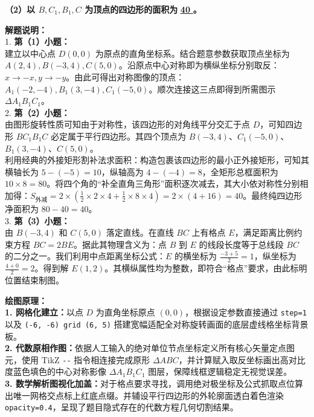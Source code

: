 \vspace{0.6cm}

\textbf{（2）以 $B, C_1, B_1, C$ 为顶点的四边形的面积为} \underline{\quad \textbf{40} \quad} \textbf{。}

\vspace{0.6cm}

{\small\color{gray}
\textbf{解题说明：}\\
1. \textbf{第（1）小题：}\\
建立以中心点 $D(0,0)$ 为原点的直角坐标系。结合题意参数获取顶点坐标为 $A(2,4), B(-3,4), C(5,0)$。沿原点中心对称即为横纵坐标分别取反：$x \rightarrow -x, y \rightarrow -y$。由此可得出对称图像的顶点：$A_1(-2,-4), B_1(3,-4), C_1(-5,0)$。顺次连接这三点即得到所需图示 $\Delta A_1B_1C_1$。\\
2. \textbf{第（2）小题：}\\
由图形旋转性质可知由于对称性，该四边形的对角线平分交汇于点 $D$，可知四边形 $BC_1B_1C$ 必定属于平行四边形。其四个顶点为 $B(-3,4)$、$C_1(-5,0)$、$B_1(3,-4)$、$C(5,0)$。\\
利用经典的外接矩形割补法求面积：构造包裹该四边形的最小正外接矩形，可知其横轴长为 $5 - (-5) = 10$，纵轴高为 $4 - (-4) = 8$，全矩形总框面积为 $10 \times 8 = 80$。将四个角的“补全直角三角形”面积逐次减去，其大小依对称性分别相加得：$S_\text{外减} = 2 \times (\frac{1}{2} \times 2 \times 4 + \frac{1}{2} \times 8 \times 4) = 2 \times (4 + 16) = 40$。最终纯四边形净面积为 $80 - 40 = 40$。\\
3. \textbf{第（3）小题：}\\
由 $B(-3,4)$ 和 $C(5,0)$ 落定直线。在直线 $BC$ 上有格点 $E$，满足距离比例约束方程 $BC=2BE$。据此其物理含义为：点 $B$ 到 $E$ 的线段长度等于总线段 $BC$ 的二分之一。我们利用中点距离坐标公式：$E$ 的横坐标为 $\frac{-3+5}{2} = 1$，纵坐标为 $\frac{4+0}{2}=2$。得到解 $E(1, 2)$。其横纵属性均为整数，即符合“格点”要求，由此标明位置结束制图。
}

\vspace{0.6cm}

{\small\color{blue!70!black}
\textbf{绘图原理：}\\
\textbf{1. 网格化建立：}以点 $D$ 为直角坐标原点 $(0,0)$，根据设定参数直接通过 \texttt{step=1} 以及 \texttt{(-6, -6) grid (6, 5)} 搭建宽幅适配全对称旋转画面的底层虚线格坐标背景板。\\
\textbf{2. 代数原相作图：}依据人工输入的绝对单位节点坐标定义所有核心矢量定点图元，使用 TikZ \texttt{-{}-{}} 指令相连接完成原形 $\Delta ABC$，并计算赋入取反坐标画出高对比度蓝色填色的中心对称影像 $\Delta A_1B_1C_1$ 图层，保障线框逻辑稳定无视觉误差。\\
\textbf{3. 数学解析图视化加盖：}对于格点要求寻找，调用绝对极坐标及公式抓取点位算出唯一网格交点标上红底点缀。并辅设平行四边形的外轮廓面透白着色渲染 \texttt{opacity=0.4}，呈现了题目隐式存在的代数方程几何切割结果。
}

